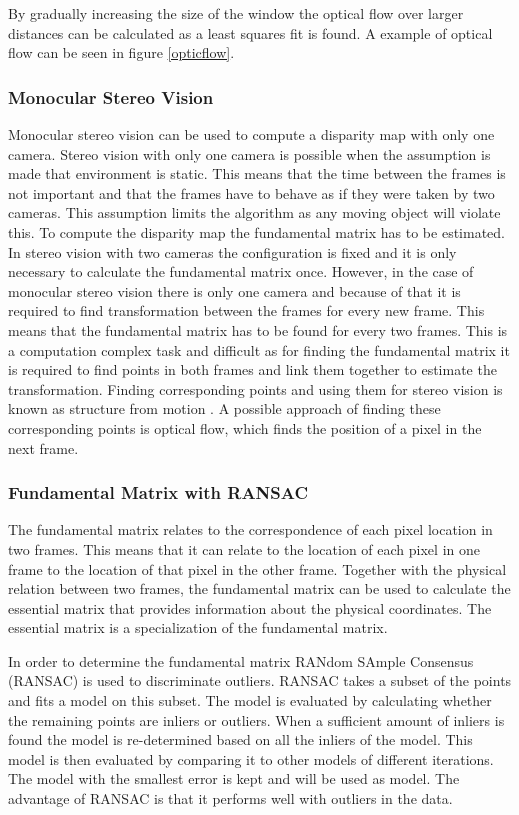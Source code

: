 \documentclass[a4paper]{article}
\begin{document}
By gradually increasing the size of the window the optical flow over larger distances can be calculated as a least squares fit is found. A example of optical flow can be seen in figure \ref{opticflow}.

\subsubsection{Monocular Stereo Vision}
Monocular stereo vision can be used to compute a disparity map with only one camera. Stereo vision with only one camera is possible when the assumption is made that environment is static. This means that the time between the frames is not important and that the frames have to behave as if they were taken by two cameras. This assumption limits the algorithm as any moving object will violate this. To compute the disparity map the fundamental matrix has to be estimated. In stereo vision with two cameras the configuration is fixed and it is only necessary to calculate the fundamental matrix once.  However, in the case of monocular stereo vision there is only one camera and because of that it is required to find transformation between the frames for every new frame. This means that the fundamental matrix has to be found for every two frames. This is a computation complex task and difficult as for finding the fundamental matrix it is required to find points in both frames and link them together to estimate the transformation. Finding corresponding points and using them for stereo vision is known as structure from motion \cite{Varga2005}. A possible approach of finding these corresponding points is optical flow, which finds the position of a pixel in the next frame.

\subsubsection{Fundamental Matrix with RANSAC}

The fundamental matrix relates to the correspondence of each pixel location in two frames. This means that it can relate to the location of each pixel in one frame to the location of that pixel in the other frame. Together with the physical relation between two frames, the fundamental matrix can be used to calculate the essential matrix \cite{Hartley2004} that provides information about the physical coordinates. The essential matrix is a specialization of the fundamental matrix. 

In order to determine the fundamental matrix RANdom SAmple Consensus (RANSAC) is used to discriminate outliers. RANSAC takes a subset of the points and fits a model on this subset. The model is evaluated by calculating whether the remaining points are inliers or outliers. When a sufficient amount of inliers is found the model is re-determined based on all the inliers of the model. This model is then evaluated by comparing it to other models of different iterations. The model with the smallest error is kept and will be used as model. The advantage of RANSAC is that it performs well with outliers in the data.
\end{document}
